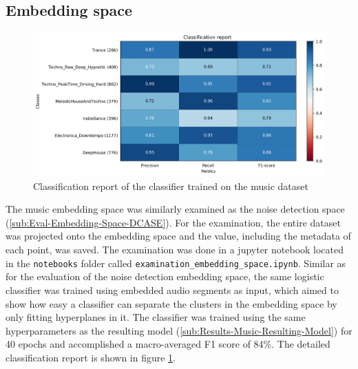 \subsection{Embedding space}
\label{sub:Results-Music-Embedding-Space}
\begin{figure}[ht]
\centering
    \includegraphics[width=0.9\linewidth]{img/music_plot_classif_report.png}
    \caption{Classification report of the classifier trained on the music dataset}
    \label{fig:Classification-Report-Muisc}
\end{figure}
\noindent
The music embedding space was similarly examined as the noise detection space (\ref{sub:Eval-Embedding-Space-DCASE}). For the examination, the entire dataset was projected onto the embedding space and the value, including the metadata of each point, was saved. The examination was done in a jupyter notebook located in the \texttt{notebooks} folder called \texttt{examination\_embedding\_space.ipynb}.
\newline
\newline
Similar as for the evaluation of the noise detection embedding space, the same logistic classifier was trained using embedded audio segments as input, which aimed to show how easy a classifier can separate the clusters in the embedding space by only fitting hyperplanes in it. The classifier was trained using the same hyperparameters as the resulting model (\ref{sub:Results-Music-Resulting-Model}) for 40 epochs and accomplished a macro-averaged F1 score of 84\%. The detailed classification report is shown in figure \ref{fig:Classification-Report-Muisc}.
\newline
\newline
